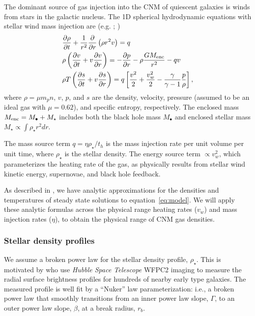 \documentclass[usenatbib,fleqn]{mnras}
\newcommand{\Menc}{M_{\rm enc}}
\renewcommand{\th}{t_h}
\begin{document}
The dominant source of gas injection into the CNM of quiescent
galaxies is winds from stars in the galactic nucleus. The 1D spherical
hydrodynamic equations with stellar wind mass injection are
(e.g. \citealt{Holzer+1970}; \citealt{Quataert2004}) 
\begin{align}
  &\frac{\partial \rho}{\partial t}+\frac{1}{r^2}\frac{\partial}{\partial r}\left(\rho r^2 v\right)=q \label{eq:drhodt}\\
  &\rho \left(\frac{\partial v}{\partial t} + v\frac{\partial
      v}{\partial r}\right) =-\frac{\partial p}{\partial r}- \rho\frac{GM_{\rm enc}}{r^{2}} -q v \label{eq:dvdt}\\
  &\rho T\left(\frac{\partial s}{\partial t} + v\frac{\partial
      s}{\partial
      r}\right)=q\left[\frac{v^2}{2}+\frac{v_w^2}{2}-\frac{\gamma}{\gamma-1}
    \frac{p}{\rho} \right] ,
\label{eq:model}
\end{align}
where $\rho = \mu m_p n$, $v$, $p$, and $s$ are the density, velocity,
pressure (assumed to be an ideal gas with $\mu = 0.62$), and specific
entropy, respectively.  The enclosed mass $\Menc = M_{\bullet} +
M_{\star}$ includes both the black hole mass $M_{\bullet}$ and
enclosed stellar mass $M_{\star} \propto \int \rho_{\star}r^{2}dr$. 

The mass source term $q =\eta \rho_\star/\th$ is the mass injection
rate per unit volume per unit time, where $\rho_\star$ is the stellar
density. The energy source term $\propto v_w^{2}$, which parameterizes the
heating rate of the gas, as physically results from stellar wind
kinetic energy, supernovae, and black hole feedback.

As described in \citet{Generozov+2015}, we have analytic approximations
for the densities and temperatures of steady state solutions to
equation~\eqref{eq:model}. We will apply these analytic formulas
across the physical range heating rates ($v_w$) and mass injection
rates ($\eta$), to obtain the physical range of CNM gas densities.

\subsubsection{Stellar density profiles}
We assume a broken power law for the stellar density profile, $\rho_{\star}$.
This is motivated by \citet{Lauer+2007} who use {\it
  Hubble Space Telescope} WFPC2 imaging to measure the radial surface
brightness profiles for hundreds of nearby early type galaxies. The
measured profile is well fit by a ``Nuker'' law parameterization:
i.e., a broken power law that smoothly transitions from an inner power law
slope, $\Gamma$, to an outer power law slope, $\beta$, at a break
radius, $r_b$.
\end{document}
